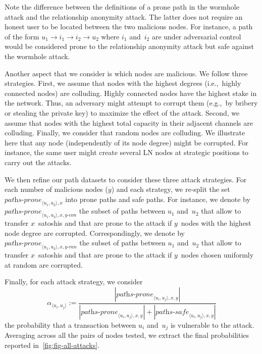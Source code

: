 Note the difference between the definitions of a prone path in the wormhole attack and the relationship anonymity attack.
The latter does not require an honest user to be located between the two malicious nodes.
For instance, a path of the form $u_1 \rightarrow i_1 \rightarrow i_2 \rightarrow u_2$ where $i_1$ and~$i_2$ are under adversarial control would be considered prone to the relationship anonymity attack but safe against the wormhole attack.

Another aspect that we consider is which nodes are malicious.
We follow three strategies.
First, we assume that nodes with the highest degrees (i.e.,~highly connected nodes) are colluding.
Highly connected nodes have the highest stake in the network.
Thus, an adversary might attempt to corrupt them (e.g.,~by bribery or stealing the private key) to maximize the effect of the attack.
Second, we assume that nodes with the highest total capacity in their adjacent channels are colluding.
Finally, we consider that random nodes are colluding.
We illustrate here that any node (independently of its node degree) might be corrupted.
For instance, the same user might create several LN nodes at strategic positions to carry out the attacks.

We then refine our path datasets to consider these three attack strategies.
For each number of malicious nodes ($y$) and each strategy, we re-split the set $\textit{paths-prone}_{\langle u_1, u_2 \rangle, x}$ into prone paths and safe paths.
For instance, we denote by $\textit{paths-prone}_{\langle u_1, u_2 \rangle, x, y\textit{-con}}$ the subset of paths between $u_1$ and~$u_2$ that allow to transfer $x$~satoshis and that are prone to the attack if $y$~nodes with the highest node degree are corrupted.
Correspondingly, we denote by $\textit{paths-prone}_{\langle u_1, u_2 \rangle, x, y\textit{-ran}}$ the subset of paths between $u_1$ and~$u_2$ that allow to transfer $x$~satoshis and that are prone to the attack if $y$~nodes chosen uniformly at random are corrupted.

Finally, for each attack strategy, we consider $$\alpha_{\langle u_i, u_j \rangle} := \frac{|\textit{paths-prone}_{\langle u_i, u_j \rangle, x, y}|}{|\textit{paths-prone}_{\langle u_i, u_j \rangle, x, y}| + |\textit{paths-safe}_{\langle u_i, u_j \rangle, x, y}|}$$ the probability that a transaction between $u_i$ and~$u_j$ is vulnerable to the attack.
Averaging across all the pairs of nodes tested, we extract the final probabilities reported in~\cref{fig:fig-all-attacks}.

